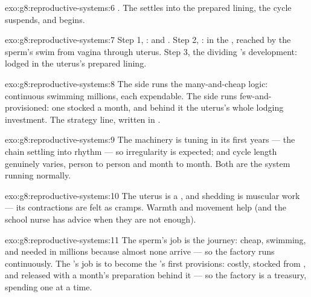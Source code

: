 \begin{solution}{exo:g8:reproductive-systems:6}
. The  settles into the prepared lining,
the cycle suspends, and  begins.
\end{solution}

\begin{solution}{exo:g8:reproductive-systems:7}
Step 1, :  and . Step 2, :
in the , reached by the sperm's swim from vagina
through uterus. Step 3, the dividing 's development:
lodged in the uterus's prepared lining.
\end{solution}

\begin{solution}{exo:g8:reproductive-systems:8}
The  side runs the many-and-cheap logic: continuous
swimming millions, each expendable. The  side runs
few-and-provisioned: one stocked  a month, and
behind it the uterus's whole lodging investment. The
strategy line, written in .
\end{solution}

\begin{solution}{exo:g8:reproductive-systems:9}
The machinery is tuning in its first years --- the 
chain settling into rhythm --- so irregularity is expected;
and cycle length genuinely varies, person to person and
month to month. Both are the system running normally.
\end{solution}

\begin{solution}{exo:g8:reproductive-systems:10}
The uterus is a , and shedding is muscular work ---
its contractions are felt as cramps. Warmth and movement
help (and the school nurse has advice when they are not
enough).
\end{solution}

\begin{solution}{exo:g8:reproductive-systems:11}
The sperm's job is the journey: cheap, swimming, and
needed in millions because almost none arrive --- so the
factory runs continuously. The 's job is to become the
's first provisions: costly, stocked from , and
released with a month's preparation behind it --- so the
factory is a treasury, spending one at a time.
\end{solution}

